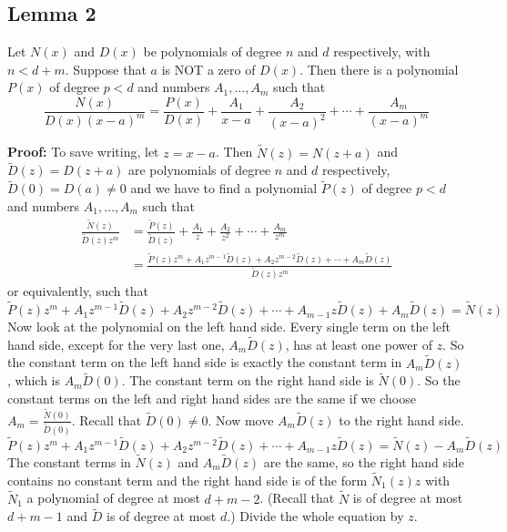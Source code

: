 \subsection{Lemma 2}
Let \(N(x)\) and \(D(x)\) be polynomials of degree \(n\) and \(d\) respectively, with \(n < d + m\).
Suppose that \(a\) is NOT a zero of \(D(x)\). Then there is a polynomial \(P(x)\) of degree \(p < d\) and
numbers \(A_1, \dots, A_m\) such that
\[
\frac{N(x)}{D(x) (x-a)^m} = \frac{P(x)}{D(x)} + \frac{A_1}{x-a} + \frac{A_2}{(x-a)^2} + \cdots + \frac{A_m}{(x-a)^m}
\]

\noindent
\textbf{Proof:} To save writing, let \(z = x - a\). Then \(\tilde{N}(z) = N(z + a)\) and \(\tilde{D}(z) = D(z + a)\)
are polynomials of degree \(n\) and \(d\) respectively, \(\tilde{D}(0) = D(a) \neq 0\) and we have to find a
polynomial \(\tilde{P}(z)\) of degree \(p < d\) and numbers \(A_1, \dots, A_m\) such that
\begin{align*}
\frac{\tilde{N}(z)}{\tilde{D}(z) z^m} &= \frac{\tilde{P}(z)}{\tilde{D}(z)} + \frac{A_1}{z} + \frac{A_2}{z^2} + \cdots + \frac{A_m}{z^m} \\
&= \frac{\tilde{P}(z) z^m + A_1 z^{m-1} \tilde{D}(z) + A_2 z^{m-2} \tilde{D}(z) + \cdots + A_m \tilde{D}(z)}{\tilde{D}(z) z^m}
\end{align*}
or equivalently, such that
\[
\tilde{P}(z)z^m + A_1 z^{m-1} \tilde{D}(z) + A_2 z^{m-2} \tilde{D}(z) + \cdots + A_{m-1} z \tilde{D}(z) + A_m \tilde{D}(z) = \tilde{N}(z)
\]
Now look at the polynomial on the left hand side. Every single term on the left hand side,
except for the very last one, \(A_m \tilde{D}(z)\), has at least one power of \(z\). So the constant term on
the left hand side is exactly the constant term in \(A_m \tilde{D}(z)\), which is \(A_m \tilde{D}(0)\). The constant
term on the right hand side is \(\tilde{N}(0)\). So the constant terms on the left and right hand sides
are the same if we choose \(A_m = \frac{\tilde{N}(0)}{\tilde{D}(0)}\). Recall that \(\tilde{D}(0) \neq 0\). Now move \(A_m \tilde{D}(z)\) to the right
hand side.
\[
\tilde{P}(z)z^m + A_1 z^{m-1} \tilde{D}(z) + A_2 z^{m-2} \tilde{D}(z) + \cdots + A_{m-1} z \tilde{D}(z) = \tilde{N}(z) - A_m \tilde{D}(z)
\]
The constant terms in \(\tilde{N}(z)\) and \(A_m \tilde{D}(z)\) are the same, so the right hand side contains no
constant term and the right hand side is of the form \(\tilde{N}_1(z)z\) with \(\tilde{N}_1\) a polynomial of degree
at most \(d + m - 2\). (Recall that \(\tilde{N}\) is of degree at most \(d + m - 1\) and \(\tilde{D}\) is of degree at most
\(d\).) Divide the whole equation by \(z\).
